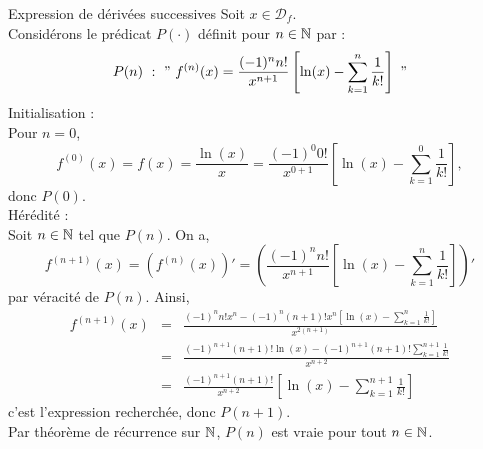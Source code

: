 \documentclass{article}
\date{13 Janvier 2024}
\begin{document}
\maketitle
	
\begin{question_kholle}
    [Exprimer : $\forall n \in \N, \ f^{(n)}(x) = \frac{d^n}{dx^n}\left( \frac{\ln (x)}{x} \right)$]
    {Expression de dérivées successives}
    Soit $x\in \mathcal{D}_f$. \\
    Considérons le prédicat $P(\cdot)$ définit pour $n\in \mathbb N$ par : 
    $$ P(n) \ : \ " \ f^{(n)}(x) = \frac{(-1)^n n!}{x^{n+1}}\left[ \ln (x) - \sum_{k=1}^n \frac{1}{k!} \right] \ " $$ 
    Initialisation : \\
    Pour $n = 0$, $$f^{(0)}(x) = f(x) = \frac{\ln (x)}{x} = \frac{(-1)^0 0!}{x^{0+1}}\left[ \ln (x) - \sum_{k=1}^0 \frac{1}{k!} \right],$$ donc $P(0)$. \\
    Hérédité : 
    \\
    Soit $n\in \mathbb N$ tel que $P(n)$. On a, 
    $$f^{(n+1)}(x) = (f^{(n)}(x))' = \left( \frac{(-1)^n n!}{x^{n+1}}\left[ \ln (x) - \sum_{k=1}^n \frac{1}{k!} \right] \right)'$$
    par véracité de $P(n)$. Ainsi, 
$$\begin{array}{rcl}
f^{(n+1)}(x) & = & \frac{(-1)^nn!x^n - (-1)^n(n+1)!x^n\left[ \ln (x) - \sum_{k=1}^n \frac{1}{k!} \right]}{x^{2(n+1)}} \\ [1ex]
 & = & \frac{(-1)^{n+1}(n+1)!\ln (x) - (-1)^{n+1}(n+1)!\sum_{k=1}^{n+1} \frac{1}{k!} }{x^{n+2}} \\ [1ex]
 & = & \frac{(-1)^{n+1} (n+1)!}{x^{n+2}}\left[ \ln (x) - \sum_{k=1}^{n+1} \frac{1}{k!} \right]
\end{array}$$
    c'est l'expression recherchée, donc $P(n+1)$. \\
    Par théorème de récurrence sur $\mathbb N$, $P(n)$ est vraie pour tout $n\in \mathbb N$.
\end{question_kholle}
\end{document}
